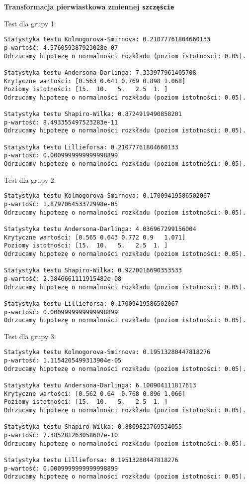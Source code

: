 \documentclass[12pt,a4paper]{article}
\begin{document}
\newpage
\begin{center}
    \textbf{Transformacja pierwiastkowa zmiennej \texttt{szczęście}}
\end{center}
Test dla grupy 1:
\begin{lstlisting}
Statystyka testu Kolmogorova-Smirnova: 0.21077761804660133
p-wartość: 4.576059387923028e-07
Odrzucamy hipotezę o normalności rozkładu (poziom istotności: 0.05).

Statystyka testu Andersona-Darlinga: 7.333977961405708
Krytyczne wartości: [0.563 0.641 0.769 0.898 1.068]
Poziomy istotności: [15.  10.   5.   2.5  1. ]
Odrzucamy hipotezę o normalności rozkładu (poziom istotności: 0.05).

Statystyka testu Shapiro-Wilka: 0.8724919490858201
p-wartość: 8.493355497523283e-11
Odrzucamy hipotezę o normalności rozkładu (poziom istotności: 0.05).

Statystyka testu Lillieforsa: 0.21077761804660133
p-wartość: 0.0009999999999998899
Odrzucamy hipotezę o normalności rozkładu (poziom istotności: 0.05).
\end{lstlisting}
Test dla grupy 2:
\begin{lstlisting}
Statystyka testu Kolmogorova-Smirnova: 0.17009419586502067
p-wartość: 1.879706453372998e-05
Odrzucamy hipotezę o normalności rozkładu (poziom istotności: 0.05).

Statystyka testu Andersona-Darlinga: 4.036967299156004
Krytyczne wartości: [0.565 0.643 0.772 0.9   1.071]
Poziomy istotności: [15.  10.   5.   2.5  1. ]
Odrzucamy hipotezę o normalności rozkładu (poziom istotności: 0.05).

Statystyka testu Shapiro-Wilka: 0.9270016690353533
p-wartość: 2.3846661111915482e-08
Odrzucamy hipotezę o normalności rozkładu (poziom istotności: 0.05).

Statystyka testu Lillieforsa: 0.17009419586502067
p-wartość: 0.0009999999999998899
Odrzucamy hipotezę o normalności rozkładu (poziom istotności: 0.05).
\end{lstlisting}
Test dla grupy 3:
\begin{lstlisting}
Statystyka testu Kolmogorova-Smirnova: 0.19513280447818276
p-wartość: 1.1154205499313904e-05
Odrzucamy hipotezę o normalności rozkładu (poziom istotności: 0.05).

Statystyka testu Andersona-Darlinga: 6.100904111817613
Krytyczne wartości: [0.562 0.64  0.768 0.896 1.066]
Poziomy istotności: [15.  10.   5.   2.5  1. ]
Odrzucamy hipotezę o normalności rozkładu (poziom istotności: 0.05).

Statystyka testu Shapiro-Wilka: 0.8809823769534055
p-wartość: 7.385281263058607e-10
Odrzucamy hipotezę o normalności rozkładu (poziom istotności: 0.05).

Statystyka testu Lillieforsa: 0.19513280447818276
p-wartość: 0.0009999999999998899
Odrzucamy hipotezę o normalności rozkładu (poziom istotności: 0.05).
\end{lstlisting}
\end{document}
